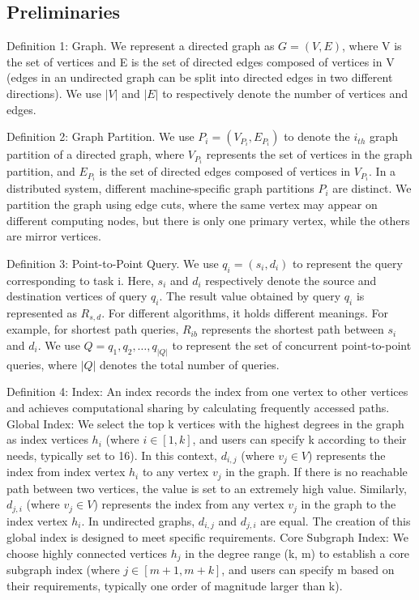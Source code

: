 \documentclass[lettersize,journal]{IEEEtran} %
\begin{document}
\subsection{Preliminaries}
Definition 1: Graph. We represent a directed graph as $G=(V,E)$, where V is the set of vertices and E is the set of directed edges composed of vertices in V (edges in an undirected graph can be split into directed edges in two different directions). We use $|V|$ and $|E|$ to respectively denote the number of vertices and edges.

Definition 2: Graph Partition. We use $P_i=(V_{P_i},E_{P_i})$ to denote the $i_{th}  $ graph partition of a directed graph, where $V_{P_i}$ represents the set of vertices in the graph partition, and $E_{P_i}$ is the set of directed edges composed of vertices in $V_{P_i}$. In a distributed system, different machine-specific graph partitions $P_i$ are distinct. We partition the graph using edge cuts, where the same vertex may appear on different computing nodes, but there is only one primary vertex, while the others are mirror vertices.

Definition 3: Point-to-Point Query. We use $q_i=(s_i,d_i)$ to represent the query corresponding to task i. Here, $s_i$ and $d_i$ respectively denote the source and destination vertices of query $q_i$. The result value obtained by query $q_i$ is represented as $R_{s,d}$. For different algorithms, it holds different meanings. For example, for shortest path queries, $R_{ib}$ represents the shortest path between $s_i$ and $d_i$. We use $Q={q_1,q_2,\ldots,q_{|Q|}}$ to represent the set of concurrent point-to-point queries, where $|Q|$ denotes the total number of queries.

Definition 4: Index: An index records the index from one vertex to other vertices and achieves computational sharing by calculating frequently accessed paths. Global Index: We select the top k vertices with the highest degrees in the graph as index vertices $h_i$ (where $i\in [1, k]$, and users can specify k according to their needs, typically set to 16). In this context, $d_{i,j}$ (where $v_j\in V$) represents the index from index vertex $h_i$ to any vertex $v_j$ in the graph. If there is no reachable path between two vertices, the value is set to an extremely high value. Similarly, $d_{j,i}$ (where $v_j\in V$) represents the index from any vertex $v_j$ in the graph to the index vertex $h_i$. In undirected graphs, $d_{i,j}$ and $d_{j,i}$ are equal. The creation of this global index is designed to meet specific requirements. Core Subgraph Index: We choose highly connected vertices $h_j$ in the degree range (k, m) to establish a core subgraph index (where $j\in [m+1, m+k]$, and users can specify m based on their requirements, typically one order of magnitude larger than k).
\end{document}
